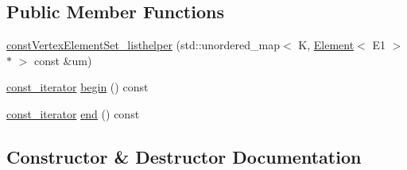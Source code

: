 \subsection*{Public Member Functions}
\begin{DoxyCompactItemize}
\item 
\mbox{\hyperlink{classbridges_1_1datastructure_1_1_graph_adj_list_1_1const_vertex_element_set__listhelper_ab558db82482552c95292e9a0a94e0880}{const\+Vertex\+Element\+Set\+\_\+listhelper}} (std\+::unordered\+\_\+map$<$ K, \mbox{\hyperlink{classbridges_1_1datastructure_1_1_element}{Element}}$<$ E1 $>$ $\ast$ $>$ const \&um)
\item 
\mbox{\hyperlink{classbridges_1_1datastructure_1_1_graph_adj_list_1_1const_vertex_element_set__listhelper_1_1const__iterator}{const\+\_\+iterator}} \mbox{\hyperlink{classbridges_1_1datastructure_1_1_graph_adj_list_1_1const_vertex_element_set__listhelper_ab51dbf954f3242e7b60ee530468c9520}{begin}} () const
\item 
\mbox{\hyperlink{classbridges_1_1datastructure_1_1_graph_adj_list_1_1const_vertex_element_set__listhelper_1_1const__iterator}{const\+\_\+iterator}} \mbox{\hyperlink{classbridges_1_1datastructure_1_1_graph_adj_list_1_1const_vertex_element_set__listhelper_a836477771db915bc417ab9f2811ac7c2}{end}} () const
\end{DoxyCompactItemize}


\subsection{Constructor \& Destructor Documentation}
\mbox{\label{classbridges_1_1datastructure_1_1_graph_adj_list_1_1const_vertex_element_set__listhelper_ab558db82482552c95292e9a0a94e0880}} 
